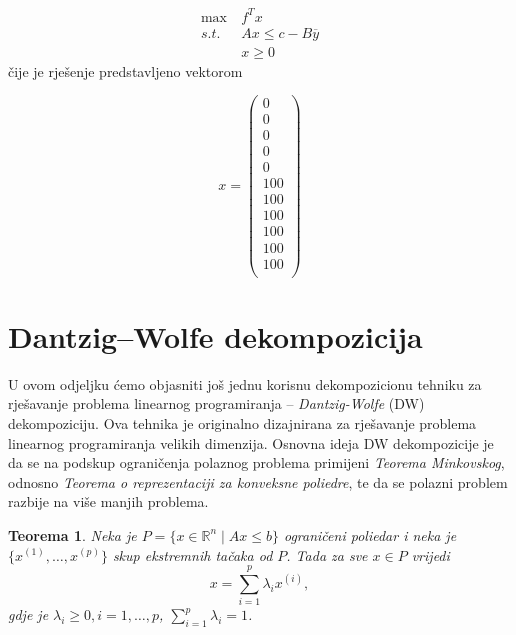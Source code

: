 \documentclass[a4paper, utf8, 11pt, colorlinks]{book}
\newtheorem{thm}{Teorema}
\begin{document}
 \begin{equation}\label{primer:formulacija3}
	\begin{aligned}
		\max\  &f^Tx\\
		s.t.\  &Ax\leqslant c-B\overline{y}\\
		&x\geqslant 0
	\end{aligned}
\end{equation}
čije je rješenje predstavljeno vektorom

$$x =\left(\begin{array}{c}
	0\\
	0\\
	0\\
	0\\
	0\\
	100\\
	100\\
	100\\
	100\\
	100\\
	100\\
\end{array}\right)$$



  \section{Dantzig--Wolfe dekompozicija}%
 
 U ovom odjeljku ćemo objasniti još jednu korisnu dekompozicionu tehniku za rješavanje problema linearnog programiranja -- \emph{Dantzig-Wolfe} (DW) dekompoziciju. Ova tehnika je originalno dizajnirana za rješavanje problema linearnog programiranja velikih dimenzija. Osnovna ideja DW dekompozicije je da se na podskup ograničenja polaznog problema primijeni \emph{Teorema Minkovskog}, odnosno \emph{Teorema o reprezentaciji za konveksne poliedre}, te da se polazni problem razbije na   više manjih problema.
 
 \begin{thm}
 	Neka je $P = \{ x \in \mathbb{R}^n \mid Ax \leq b\}$ ograničeni poliedar i neka je $\{x^{(1)}, \ldots, x^{(p)} \}$ skup ekstremnih tačaka od $P$. Tada za sve $x \in P$ vrijedi 
 	 $$ x = \sum_{i=1}^p \lambda_i x^{(i)},$$ 
 	 gdje je $\lambda_i \geq 0,i=1,\ldots,p$, $\sum_{i=1}^p \lambda_i=1$.
 \end{thm}
 
\end{document}
